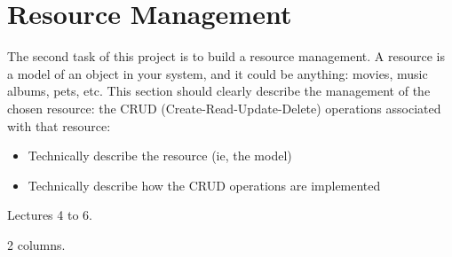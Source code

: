 \section{Resource Management}

The second task of this project is to build a resource management.
A resource is a model of an object in your system, and it could be anything: movies, music albums, pets, etc.
This section should clearly describe the management of the chosen resource: the CRUD (Create-Read-Update-Delete) operations associated with that resource:

\begin{itemize}
    \item Technically describe the resource (ie, the model)
    \item Technically describe how the CRUD operations are implemented
\end{itemize}

 Lectures 4 to 6.

 2 columns.